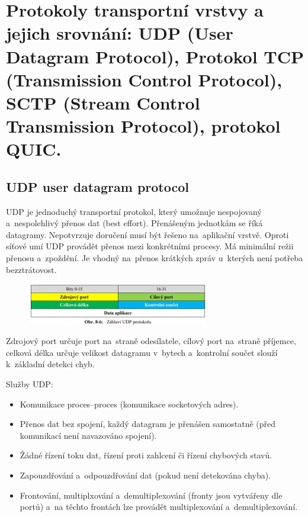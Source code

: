 \clearpage
\section{Protokoly transportní vrstvy a jejich srovnání: UDP (User Datagram Protocol), Protokol TCP (Transmission Control Protocol), SCTP (Stream Control Transmission Protocol), protokol QUIC.}

\subsection{UDP user datagram protocol}

UDP je jednoduchý transportní protokol, který umožnuje nespojovaný a~nespolehlivý přenos dat (best effort). Přenášeným jednotkám se říká datagramy. Nepotvrzuje doručení musí být řešeno na~aplikační vrstvě. Oproti síťové umí UDP provádět přenos mezi konkrétními procesy. Má minimální režii přenosu a~zpoždění. Je vhodný na~přenos krátkých zpráv u~kterých není potřeba bezztrátovost.

\begin{figure}[!h]
    \centering
    \includegraphics[width=0.7\textwidth]{obrazky/030.png}
\end{figure}

Zdrojový port určuje port na~straně odesílatele, cílový port na~straně příjemce, celková délka určuje velikost datagramu v~bytech a~kontrolní součet slouží k~základní detekci chyb.

Služby UDP:
\begin{itemize}[noitemsep]
    \item Komunikace proces--proces (komunikace socketových adres).
    \item Přenos dat bez spojení, každý datagram je přenášen samostatně (před komunikací není navazováno spojení).
    \item Žádné řízení toku dat, řízení proti zahlcení či řízení chybových stavů.
    \item Zapouzdřování a~odpouzdřování dat (pokud není detekována chyba).
    \item Frontování, multiplxování a~demultiplexování (fronty jsou vytvářeny dle portů) a~na těchto frontách lze provádět multiplexování a~demultiplexování.
\end{itemize}

